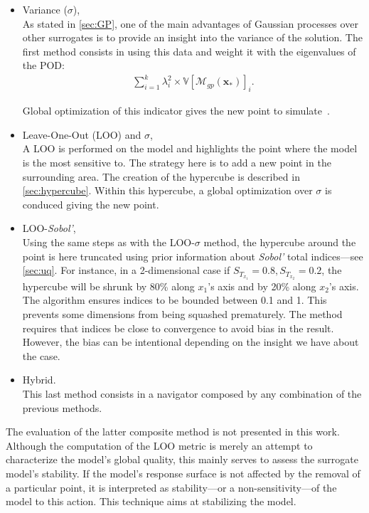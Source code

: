 \begin{itemize}
\item Variance ($\sigma$), \hfill\\
As stated in \cref{sec:GP}, one of the main advantages of Gaussian processes over other surrogates is to provide an insight into the variance of the solution. The first method consists in using this data and weight it with the eigenvalues of the POD:
\begin{align}
\sum_{i=1}^k \lambda_i^2 \times \mathbb{V}[\mathcal{M}_{gp}(\mathbf{x}_*)]_{i}.
\end{align}

Global optimization of this indicator gives the new point to simulate~\cite{wales1997}.

\item Leave-One-Out (LOO) and $\sigma$, \hfill\\
A LOO is performed on the model and highlights the point where the model is the most sensitive to. The strategy here is to add a new point in the surrounding area. The creation of the hypercube is described in \cref{sec:hypercube}. Within this hypercube, a global optimization over $\sigma$ is conduced giving the new point.

\item  LOO-\textit{Sobol'}, \hfill\\
Using the same steps as with the LOO-$\sigma$ method, the hypercube around the point is here truncated using prior information about \textit{Sobol'} total indices---see \cref{sec:uq}. For instance, in a 2-dimensional case if $S_{T_{x_1}} = 0.8, S_{T_{x_2}} = 0.2$, the hypercube will be shrunk by 80\% along $x_1$'s axis and by 20\% along $x_2$'s axis. The algorithm ensures indices to be bounded between 0.1 and 1. This prevents some dimensions from being squashed prematurely. The method requires that indices be close to convergence to avoid bias in the result. However, the bias can be intentional depending on the insight we have about the case. 

\item  Hybrid.\hfill\\
This last method consists in a navigator composed by any combination of the previous methods.
\end{itemize}

The evaluation of the latter composite method is not presented in this work. Although the computation of the LOO metric is merely an attempt to characterize the model's global quality, this mainly serves to assess the surrogate model's stability. If the model's response surface is not affected by the removal of a particular point, it is interpreted as stability---or a non-sensitivity---of the model to this action. This technique aims at stabilizing the model.

